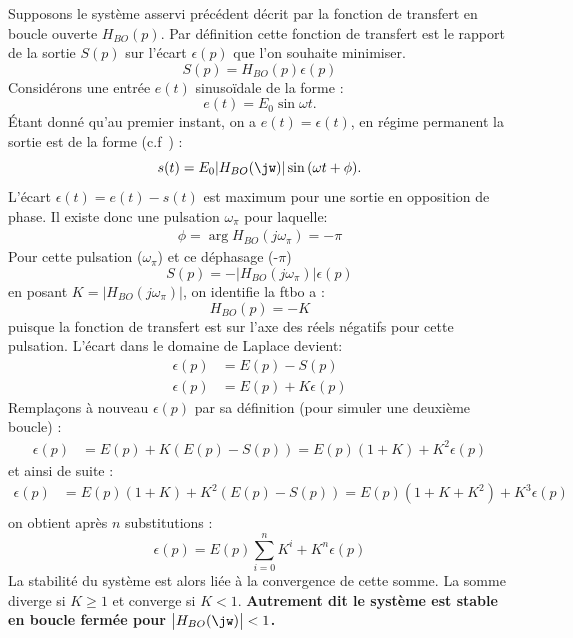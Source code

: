 Supposons le système asservi précédent décrit par la fonction de transfert 
en boucle ouverte $H_{BO}(p)$. Par définition cette fonction de transfert 
est le rapport de la sortie $S(p)$ sur l'écart $\epsilon(p)$ que l'on 
souhaite minimiser.
\[
    S(p)=H_{BO}(p)\epsilon(p)
\]
Considérons une entrée $e(t)$ sinuso\"idale de la forme :
\[
    e(t)=E_0\sin{\omega t}.
\]
\'Etant donné qu'au premier instant, on a $e(t)=\epsilon(t)$,
en régime permanent la sortie est de la forme (c.f~) :
\[
    s(t)=E_0|H_{BO}(\jw)|\sin{(\omega t+\phi)}.
\]
L'écart $\epsilon(t)=e(t)-s(t)$ est maximum pour une sortie en opposition 
de phase. Il existe donc une pulsation $\omega_\pi$ pour laquelle:
\begin{align*}
    \phi=\arg{H_{BO}(j\omega_\pi)}=-\pi
\end{align*}
Pour cette pulsation ($\omega_\pi$) et ce déphasage (-$\pi$)
\[
    S(p)=-\big|H_{BO}(j\omega_\pi)\big|\epsilon(p)
\]
en posant $K=|H_{BO}(j\omega_\pi)|$, on identifie la \gls{ftbo} a :
\[
    H_{BO}(p)=-K
\]
puisque la fonction de transfert est sur l'axe des réels négatifs pour 
cette pulsation.
L'écart dans le domaine de Laplace devient:
\begin{align*}
    \epsilon(p)&=E(p)-S(p)\\
    \epsilon(p)&=E(p)+K\epsilon(p)
\end{align*}
Remplaçons à nouveau $\epsilon(p)$ par sa définition (pour simuler une 
deuxième boucle) : 
\begin{align*}
    \epsilon(p)&=E(p)+K(E(p)-S(p))=E(p)(1+K)+K^2\epsilon(p)
\end{align*}
et ainsi de suite :
\begin{align*}
    \epsilon(p)&=E(p)(1+K)+K^2\left(E(p)-S(p)\right)
                =E(p)(1+K+K^2)+K^3\epsilon(p)\\
\end{align*}
on obtient après $n$ substitutions :
\[
\epsilon(p)=E(p)\sum_{i=0}^{n}K^i+K^n\epsilon(p)
\]
La stabilité du système est alors liée à la convergence de cette somme.
La somme diverge si $K\geq1$ et converge si $K<1$. 
\textbf{Autrement dit le système est stable en boucle fermée 
pour $\big|H_{BO}(\jw)\big|<1$.}

